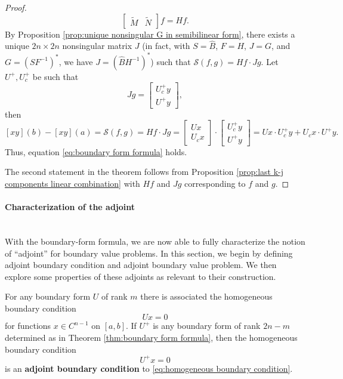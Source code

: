 \documentclass[11pt, oneside, a4paper]{article}
\begin{document}
\begin{proof}
\[\begin{bmatrix}
    \tilde{M} & \tilde{N}\end{bmatrix}f = Hf.\]
    By Proposition \ref{prop:unique nonsingular G in semibilinear form}, there exists a unique $2n\times 2n$ nonsingular matrix $J$ (in fact, with $S = \hat{B}$, $F=H$, $J=G$, and $G=(SF^{-1})^*$, we have $J=(\hat{B}H^{-1})^*$) such that $\mathcal{S}(f,g) = Hf\cdot Jg$. Let $U^+, U_c^+$ be such that
    \[Jg = \begin{bmatrix}U_c^+ y\\ U^+y\end{bmatrix},\]
    then 
    \[[xy](b)-[xy](a)=\mathcal{S}(f,g) = Hf\cdot Jg = \begin{bmatrix}Ux\\ U_cx\end{bmatrix}\cdot\begin{bmatrix}U_c^+ y \\ U^+y\end{bmatrix} = Ux\cdot U_c^+y + U_cx\cdot U^+y.\]
    Thus, equation \eqref{eq:boundary form formula} holds.

    The second statement in the theorem follows from Proposition \ref{prop:last k-j components linear combination} with $Hf$ and $Jg$ corresponding to $f$ and $g$.
\end{proof}

\paragraph{Characterization of the adjoint}\mbox{}\\
With the boundary-form formula, we are now able to fully characterize the notion of ``adjoint'' for boundary value problems. In this section, we begin by defining adjoint boundary condition and adjoint boundary value problem. We then explore some properties of these adjoints as relevant to their construction.

\begin{defn}\cite[p.288-89]{CoddingtonLevinson}\label{defn:adjoint boundary condition}
    For any boundary form $U$ of rank $m$ there is associated the homogeneous boundary condition
    \begin{equation}\label{eq:homogeneous boundary condition}
        Ux=0
    \end{equation}
    for functions $x\in C^{n-1}$ on $[a,b]$. If $U^+$ is any boundary form of rank $2n-m$ determined as in Theorem \ref{thm:boundary form formula}, then the homogeneous boundary condition
    \begin{equation}\label{eq:adjoint boundary condition}
        U^+x=0
    \end{equation}
    is an \textbf{adjoint boundary condition} to \eqref{eq:homogeneous boundary condition}.
\end{defn}
\end{document}
